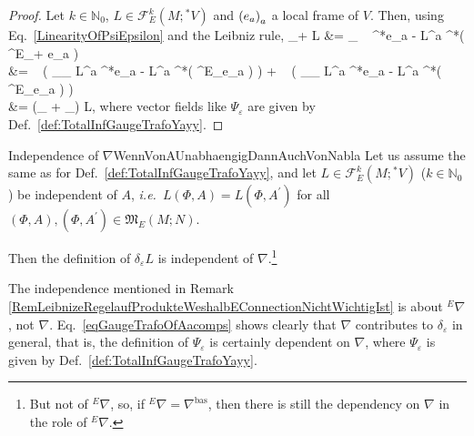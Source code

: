 \begin{proof}
\leavevmode\newline
Let $k \in \mathbb{N}_0$, $L \in \mathcal{F}^k_E(M; {}^*V)$ and $\mleft( e_a \mright)_a$ a local frame of $V$. Then, using Eq.~\eqref{LinearityOfPsiEpsilon} and the Leibniz rule,
\bas
\delta_{\alpha \varepsilon + \beta \vartheta} L
&=
_{ }
 \otimes ~ {}^*e_a
	- L^a \otimes {}^*\mleft( {}^E\nabla_{\alpha \varepsilon + \beta \vartheta} e_a \mright)
\\
&=
\alpha ~ \mleft(
	_{\Psi_\varepsilon} L^a \otimes {}^*e_a
	- L^a \otimes {}^*\mleft( {}^E\nabla_\varepsilon e_a \mright)
\mright)
	+ \beta ~ \mleft(
	_{\Psi_\vartheta} L^a \otimes {}^*e_a
	- L^a \otimes {}^*\mleft( {}^E\nabla_\vartheta e_a \mright)
\mright)
\\
&=
\mleft(\alpha \delta_\varepsilon
	+ \beta \delta_\vartheta\mright) L,
\eas
where vector fields like $\Psi_\varepsilon$ are given by Def.~\ref{def:TotalInfGaugeTrafoYayy}.
\end{proof}

\begin{corollaries}{Independence of $\nabla$}{WennVonAUnabhaengigDannAuchVonNabla}
Let us assume the same as for Def.~\ref{def:TotalInfGaugeTrafoYayy}, and let $L \in \mathcal{F}^k_E(M; {}^*V)$ ($k \in \mathbb{N}_0$) be independent of $A$, \textit{i.e.}~$L(\Phi,A) = L(\Phi, A^\prime)$ for all $(\Phi,A), (\Phi, A^\prime) \in \mathfrak{M}_E(M; N)$.

Then the definition of $\delta_\varepsilon L$ is independent of $\nabla$.\footnote{But not of ${}^E\nabla$, so, if ${}^E\nabla = \nabla^{\mathrm{bas}}$, then there is still the dependency on $\nabla$ in the role of ${}^E\nabla$.}
\end{corollaries}

\begin{remark}
\leavevmode\newline
The independence mentioned in Remark \ref{RemLeibnizeRegelaufProdukteWeshalbEConnectionNichtWichtigIst} is about ${}^E\nabla$, not $\nabla$. Eq.~\eqref{eqGaugeTrafoOfAacomps} shows clearly that $\nabla$ contributes to $\delta_\varepsilon$ in general, that is, the definition of $\Psi_\varepsilon$ is certainly dependent on $\nabla$, where $\Psi_\varepsilon$ is given by Def.~\ref{def:TotalInfGaugeTrafoYayy}.
\end{remark}

